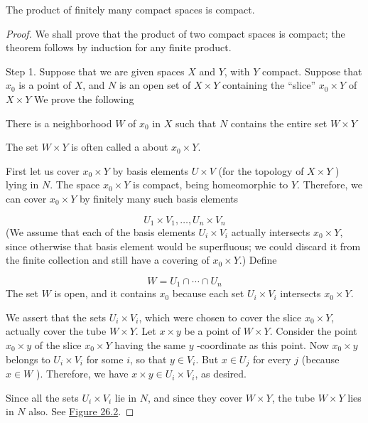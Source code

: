 \begin{theorem}
\label{thm:\thetheorem}
 The product of finitely many compact spaces is compact.

\end{theorem}
\begin{proof}
 We shall prove that the product of two compact spaces is compact; the theorem follows by induction for any finite product.

Step 1. Suppose that we are given spaces \(X\) and \(Y\), with \(Y\) compact. Suppose that \(x_{0}\) is a point of \(X\), and \(N\) is an open set of \(X \times Y\) containing the ``slice'' \(x_{0} \times Y\) of \(X \times Y\) We prove the following

There is a neighborhood \(W\) of \(x_{0}\) in \(X\) such that \(N\) contains the entire set \(W \times Y\)

The set \(W \times Y\) is often called a  about \(x_{0} \times Y\).

First let us cover \(x_{0} \times Y\) by basis elements \(U \times V\) (for the topology of \(X \times Y\) ) lying in \(N\). The space \(x_{0} \times Y\) is compact, being homeomorphic to \(Y\). Therefore, we can cover \(x_{0} \times Y\) by finitely many such basis elements

\[
U_{1} \times {V}_{1},\ldots ,U_{n} \times {V}_{n}
\]
(We assume that each of the basis elements \(U_{i} \times {V}_{i}\) actually intersects \(x_{0} \times Y\), since otherwise that basis element would be superfluous; we could discard it from the finite collection and still have a covering of \(x_{0} \times Y\).) Define

\[
W = U_{1} \cap \cdots \cap {U}_{n}
\]
The set \(W\) is open, and it contains \(x_{0}\) because each set \(U_{i} \times {V}_{i}\) intersects \(x_{0} \times Y\).

We assert that the sets \(U_{i} \times {V}_{i}\), which were chosen to cover the slice \(x_{0} \times Y\), actually cover the tube \(W \times Y\). Let \(x \times y\) be a point of \(W \times Y\). Consider the point \(x_{0} \times y\) of the slice \(x_{0} \times Y\) having the same \(y\) -coordinate as this point. Now \(x_{0} \times y\) belongs to \(U_{i} \times {V}_{i}\) for some \(i\), so that \(y \in {V}_{i}\). But \(x \in {U}_{j}\) for every \(j\) (because \(x \in W\) ). Therefore, we have \(x \times y \in {U}_{i} \times {V}_{i}\), as desired.

Since all the sets \(U_{i} \times {V}_{i}\) lie in \(N\), and since they cover \(W \times Y\), the tube \(W \times Y\) lies in \(N\) also. See \hyperref[fig:26.2]{Figure 26.2}.


\end{proof}
